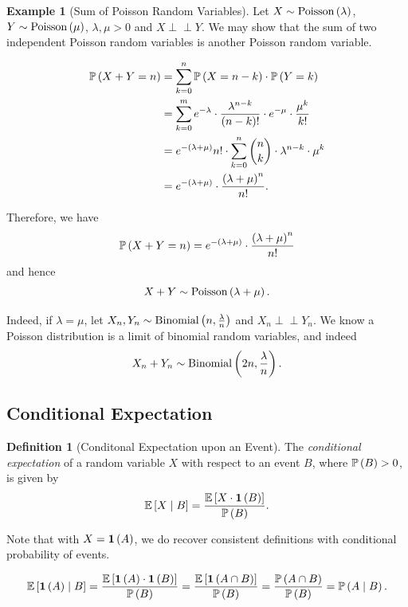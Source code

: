 \documentclass{article}
\theoremstyle{definition}
\newtheorem{definition}[theorem]{Definition}
\newtheorem{example}[theorem]{Example}
\theoremstyle{remark}
\newcommand{\Prob}{\mathbb{P}}
\newcommand{\Expt}{\mathbb{E}}
\newcommand{\Conditional}[2]{#1\mid #2}
\newcommand{\indicator}{\mathbf{1}}
\newcommand{\indp}{\mathrel{\perp\!\!\!\perp}}
\newcommand{\Binomial}{\operatorname{Binomial}}
\newcommand{\Poisson}{\operatorname{Poisson}}
\begin{document}
\begin{example}[Sum of Poisson Random Variables]
    Let \(X \sim \Poisson\pqty{\lambda}\), \(Y \sim \Poisson\pqty{\mu}\), \(\lambda, \mu > 0\) and \(X \indp Y\). We may show that the sum of two independent Poisson random variables is another Poisson random variable.

    \begin{align*}
        \Prob\pqty{X + Y = n} &= \sum_{k = 0}^{n} \Prob\pqty{X = n - k} \cdot \Prob\pqty{Y = k} \\
        &= \sum_{k = 0}^{m} e^{-\lambda} \cdot \frac{\lambda^{n - k}}{\pqty{n - k}!} \cdot e^{-\mu} \cdot \frac{\mu^k}{k!} \\
        &= e^{-\pqty{\lambda + \mu}}{n!} \cdot \sum_{k = 0}^{n} \binom{n}{k} \cdot \lambda^{n - k} \cdot \mu^k \\
        &= e^{-\pqty{\lambda + \mu}} \cdot \frac{\pqty{\lambda + \mu}^n}{n!}.
    \end{align*}

    Therefore, we have
    \[
        \Prob\pqty{X + Y = n} = e^{-\pqty{\lambda + \mu}} \cdot \frac{\pqty{\lambda + \mu}^n}{n!}
    \]
    and hence
    \[
        X + Y \sim \Poisson \pqty{\lambda + \mu}.
    \]

    Indeed, if \(\lambda = \mu\), let \(X_n, Y_n \sim \Binomial\pqty{n, \frac{\lambda}{n}}\) and \(X_n \indp Y_n\). We know a Poisson distribution is a limit of binomial random variables, and indeed
    \[
        X_n + Y_n \sim \Binomial\pqty{2n, \frac{\lambda}{n}}.
    \]
\end{example}

\subsection{Conditional Expectation}

\begin{definition}[Conditonal Expectation upon an Event]
    \label{def:conditional-expectation-upon-event}%
    The \emph{conditional expectation} of a random variable \(X\) with respect to an event \(B\), where \(\Prob\pqty{B} > 0\), is given by
    \[
        \Expt\bqty{\Conditional{X}{B}} = \frac{\Expt\bqty{X \cdot \indicator\pqty{B}}}{\Prob\pqty{B}}.
    \]
\end{definition}

Note that with \(X = \indicator\pqty{A}\), we do recover consistent definitions with conditional probability of events.

\[
    \Expt\bqty{\Conditional{\indicator\pqty{A}}{B}} = \frac{\Expt\bqty{\indicator\pqty{A} \cdot \indicator\pqty{B}}}{\Prob\pqty{B}} = \frac{\Expt\bqty{\indicator\pqty{A \cap B}}}{\Prob\pqty{B}} = \frac{\Prob\pqty{A \cap B}}{\Prob\pqty{B}} = \Prob\pqty{\Conditional{A}{B}}.
\]
\end{document}
